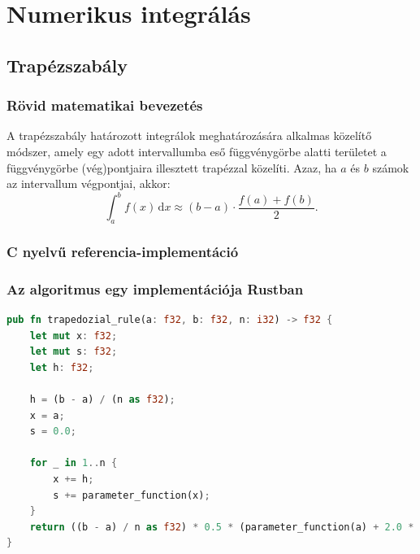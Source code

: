 \section{Numerikus integrálás}

\subsection{Trapézszabály}

\subsubsection{Rövid matematikai bevezetés}

A trapézszabály határozott integrálok meghatározására alkalmas közelítő módszer, amely egy adott intervallumba eső függvénygörbe alatti területet a függvénygörbe (vég)pontjaira illesztett trapézzal közelíti. Azaz, ha $a$ és $b$ számok az intervallum végpontjai, akkor:
\[
\int_{a}^{b} \! f(x) \, \textrm{d} x \approx (b - a) \cdot \frac{f(a) + f(b)}{2}.
\]

\subsubsection{C nyelvű referencia-implementáció}


\subsubsection{Az algoritmus egy implementációja Rustban}

\begin{lstlisting}[language=Rust, style=boxed]
pub fn trapedozial_rule(a: f32, b: f32, n: i32) -> f32 {
    let mut x: f32;
    let mut s: f32;
    let h: f32;

    h = (b - a) / (n as f32);
    x = a;
    s = 0.0;

    for _ in 1..n {
        x += h;
        s += parameter_function(x);
    }
    return ((b - a) / n as f32) * 0.5 * (parameter_function(a) + 2.0 * s + parameter_function(b));
}
\end{lstlisting}

